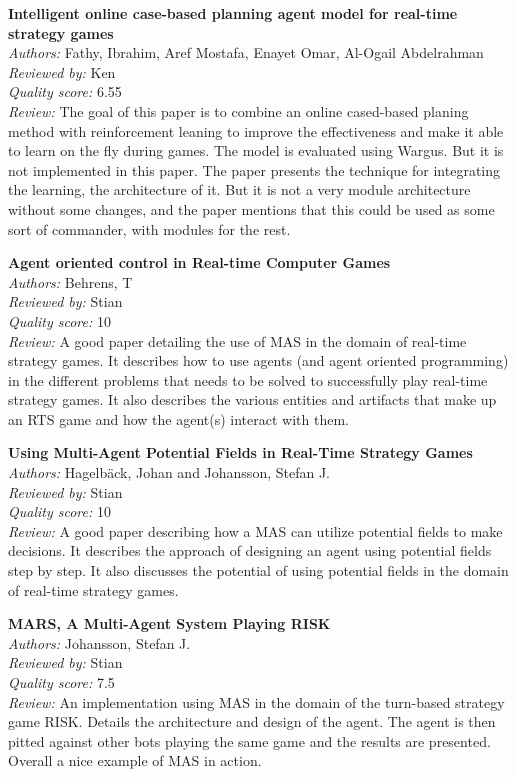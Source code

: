 {\textbf{Intelligent online case-based planning agent model for real-time strategy games\cite{fathy2010intelligent}}\\
\textit{Authors:} Fathy, Ibrahim, Aref Mostafa, Enayet Omar, Al-Ogail Abdelrahman	\\
\textit{Reviewed by:} Ken\\
\textit{Quality score:} 6.55\\
\textit{Review:} The goal of this paper is to combine an online cased-based planing method with reinforcement leaning to improve the effectiveness and make it able to learn on the fly during games. The model is evaluated using Wargus. But it is not implemented in this paper. The paper presents the technique for integrating the learning, the architecture of it. But it is not a  very module architecture without some changes, and the paper mentions that this could be used as some sort of commander, with modules for the rest.

\textbf{Agent oriented control in Real-time Computer Games\cite{behrens2010agent}}\\
\textit{Authors:} Behrens, T\\
\textit{Reviewed by:} Stian\\
\textit{Quality score:} 10\\
\textit{Review:} A good paper detailing the use of MAS in the domain of real-time strategy games. It describes how to use agents (and agent oriented programming) in the different problems that needs to be solved to successfully play real-time strategy games. It also describes the various entities and artifacts that make up an RTS game and how the agent(s) interact with them. 

\textbf{Using Multi-Agent Potential Fields in Real-Time Strategy Games\cite{hagelbäck2008using}}\\
\textit{Authors:} Hagelb\"{a}ck, Johan and Johansson, Stefan J.\\
\textit{Reviewed by:} Stian\\
\textit{Quality score:} 10\\
\textit{Review:} A good paper describing how a MAS can utilize potential fields to make decisions. It describes the approach of designing an agent using potential fields step by step. It also discusses the potential of using potential fields in the domain of real-time strategy games.

\textbf{MARS, A Multi-Agent System Playing RISK\cite{johansson2005mars}}\\
\textit{Authors:} Johansson, Stefan J.\\
\textit{Reviewed by:} Stian\\
\textit{Quality score:} 7.5\\
\textit{Review:} An implementation using MAS in the domain of the turn-based strategy game RISK. Details the architecture and design of the agent. The agent is then pitted against other bots playing the same game and the results are presented. Overall a nice example of MAS in action. 

}
